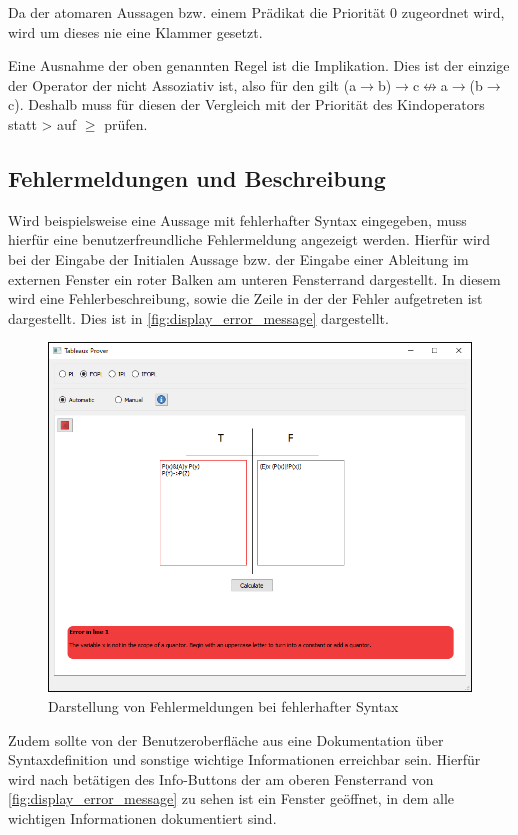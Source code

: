 Da der atomaren Aussagen bzw. einem Prädikat die Priorität 0 zugeordnet wird, wird um dieses nie eine Klammer gesetzt.

Eine Ausnahme der oben genannten Regel ist die Implikation. Dies ist der einzige der Operator der nicht Assoziativ ist, also für den gilt (a$\rightarrow$b)$\rightarrow$c$\nleftrightarrow$a$\rightarrow$(b$\rightarrow$c). Deshalb muss für diesen der Vergleich mit der Priorität des Kindoperators statt > auf $\geq$ prüfen.

\subsection{Fehlermeldungen und Beschreibung}
Wird beispielsweise eine Aussage mit fehlerhafter Syntax eingegeben, muss hierfür eine benutzerfreundliche Fehlermeldung angezeigt werden. Hierfür wird bei der Eingabe der Initialen Aussage bzw. der Eingabe einer Ableitung im externen Fenster ein roter Balken am unteren Fensterrand dargestellt. In diesem wird eine Fehlerbeschreibung, sowie die Zeile in der der Fehler aufgetreten ist dargestellt. Dies ist in \autoref{fig:display_error_message} dargestellt.

\begin{figure}[h]
\begin{center}
\includegraphics[scale=0.8]{images/display_error_message.png}
\caption{Darstellung von Fehlermeldungen bei fehlerhafter Syntax}
\label{fig:display_error_message}
\end{center}
\end{figure}

Zudem sollte von der Benutzeroberfläche aus eine Dokumentation über Syntaxdefinition und sonstige wichtige Informationen erreichbar sein. Hierfür wird nach betätigen des Info-Buttons der am oberen Fensterrand von \autoref{fig:display_error_message} zu sehen ist ein Fenster geöffnet, in dem alle wichtigen Informationen dokumentiert sind.